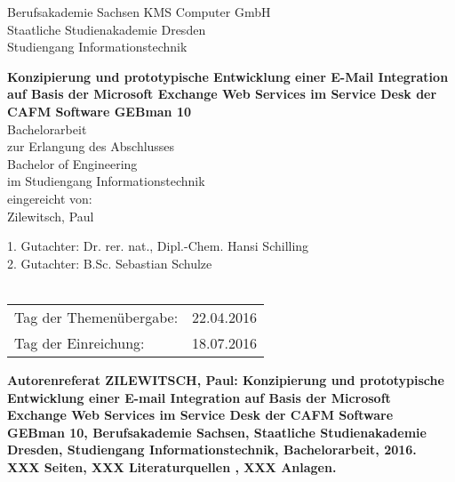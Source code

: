 \documentclass[fontsize=12pt]{scrartcl}
\begin{document}
\thispagestyle{empty}
\large
	\noindent Berufsakademie Sachsen \hfill KMS Computer GmbH\\
	Staatliche Studienakademie Dresden \\
	Studiengang Informationstechnik
\begin{center}	
	\vspace*{4cm}
	\textbf{Konzipierung und prototypische Entwicklung einer E-Mail Integration auf Basis der Microsoft Exchange Web Services im Service Desk der CAFM Software GEBman 10}\\
	\vspace*{2cm}
		Bachelorarbeit\\ zur Erlangung des Abschlusses\\ Bachelor of Engineering\\ im Studiengang 						Informationstechnik \\
	\vspace*{2cm}
	eingereicht von:\\Zilewitsch, Paul
	\vspace*{3cm}
\end{center}
	1. Gutachter: Dr. rer. nat., Dipl.-Chem. Hansi Schilling\\
	2. Gutachter: B.Sc. Sebastian Schulze 
	\\\\
	\begin{tabular}{@{}ll}
		Tag der Themenübergabe:&22.04.2016\\
		Tag der Einreichung:&18.07.2016
	\end{tabular}
\pagebreak





\noindent
\Large\bfseries
Autorenreferat
\normalsize\mdseries
\thispagestyle{empty}
\newline\newline
\noindent
ZILEWITSCH, Paul: Konzipierung und prototypische Entwicklung einer E-mail Integration auf Basis der Microsoft Exchange Web Services im Service Desk der CAFM Software GEBman 10,  Berufsakademie Sachsen, Staatliche Studienakademie Dresden, Studiengang Informationstechnik, Bachelorarbeit, 2016.\\ 
XXX Seiten, XXX Literaturquellen , XXX Anlagen. \\\\\\
\end{document}
